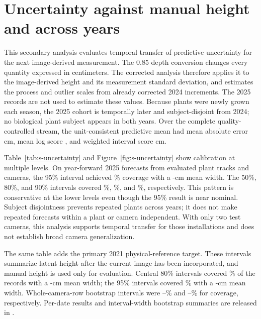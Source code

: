 \documentclass[12pt,letterpaper]{article}
\begin{document}
\section{Uncertainty against manual height and across years}
\label{sec:s-uncertainty}

This secondary analysis evaluates temporal transfer of predictive uncertainty for the next image-derived measurement. The 0.85 depth conversion changes every quantity expressed in centimeters. The corrected analysis therefore applies it to the image-derived height and its measurement standard deviation, and estimates the process and outlier scales from already corrected 2024 increments. The 2025 records are not used to estimate these values. Because plants were newly grown each season, the 2025 cohort is temporally later and subject-disjoint from 2024; no biological plant subject appears in both years. Over the complete quality-controlled stream, the unit-consistent predictive mean had mean absolute error \ForecastBayesMAE{} cm, mean log score \CalibratedLogScore{}, and weighted interval score \CalibratedWIS{} cm.

Table~\ref{tab:s-uncertainty} and Figure~\ref{fig:s-uncertainty} show calibration at multiple levels. On \UncertaintyTestN{} year-forward 2025 forecasts from \UncertaintyTestPlants{} evaluated plant tracks and \UncertaintyTestCameras{} cameras, the 95\% interval achieved \UncertaintyTestCoverageNinetyFive{}\% coverage with a \UncertaintyTestWidthNinetyFive{}-cm mean width. The 50\%, 80\%, and 90\% intervals covered \UncertaintyTestCoverageFifty{}\%, \UncertaintyTestCoverageEighty{}\%, and \UncertaintyTestCoverageNinety{}\%, respectively. This pattern is conservative at the lower levels even though the 95\% result is near nominal. Subject disjointness prevents repeated plants across years; it does not make repeated forecasts within a plant or camera independent. With only two test cameras, this analysis supports temporal transfer for those installations and does not establish broad camera generalization.

The same table adds the primary 2021 physical-reference target. These intervals summarize latent height after the current image has been incorporated, and manual height is used only for evaluation. Central 80\% intervals covered \FieldCoverageEighty{}\% of the \FieldN{} records with a \FieldIntervalWidthEighty{}-cm mean width; the 95\% intervals covered \FieldCoverageNinetyFive{}\% with a \FieldIntervalWidthNinetyFive{}-cm mean width. Whole-camera-row bootstrap intervals were \FieldCoverageEightyLo{}--\FieldCoverageEightyHi{}\% and \FieldCoverageNinetyFiveLo{}--\FieldCoverageNinetyFiveHi{}\% for coverage, respectively. Per-date results and interval-width bootstrap summaries are released in .
\end{document}
